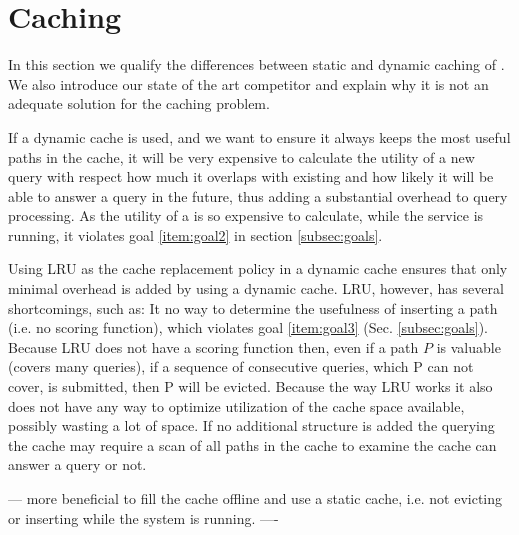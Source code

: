 \section{\spath Caching}\label{sec:competitors}

In this section we qualify the differences between static and dynamic caching of \spathsns. We also introduce our state of the art competitor and explain why it is not an adequate solution for the \spath caching problem.


If a dynamic cache is used\footnotemark, and we want to ensure it always keeps the most useful paths in the cache, it will be very expensive to calculate the utility of a new query with respect how much it overlaps with existing \spaths and how likely it will be able to answer a query in the future, thus adding a substantial overhead to query processing. As the utility of a \spath is so expensive to calculate, while the \spath service is running, it violates goal \ref{item:goal2} in section \ref{subsec:goals}.

Using LRU as the cache replacement policy in a dynamic cache ensures that only minimal overhead is added by using a dynamic cache. LRU, however, has several shortcomings, such as: It no way to determine the usefulness of inserting a path (i.e. no scoring function), which violates goal \ref{item:goal3} (Sec. \ref{subsec:goals}). Because LRU does not have a scoring function then, even if a path $P$ is valuable (covers many queries), if a sequence of consecutive queries, which P can not cover, is submitted, then P will be evicted. Because the way LRU works it also does not have any way to optimize utilization of the cache space available, possibly wasting a lot of space. If no additional structure is added the querying the cache may require a scan of all paths in the cache to examine the cache can answer a query or not.


---
more beneficial to fill the cache offline and use a static cache, i.e. not evicting or inserting \spaths while the system is running.
----








